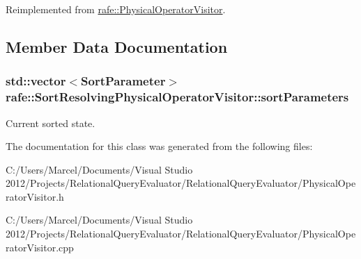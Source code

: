Reimplemented from \hyperlink{classrafe_1_1_physical_operator_visitor_a01eb10e07cc1fbe7622bc1eb01fa3b79}{rafe\+::\+Physical\+Operator\+Visitor}.



\subsection{Member Data Documentation}
\hypertarget{classrafe_1_1_sort_resolving_physical_operator_visitor_a47bd7f1cd17bf27e8313f77683413929}{
\subsubsection[{sort\+Parameters}]{\setlength{\rightskip}{0pt plus 5cm}std\+::vector$<${\bf Sort\+Parameter}$>$ rafe\+::\+Sort\+Resolving\+Physical\+Operator\+Visitor\+::sort\+Parameters}}\label{classrafe_1_1_sort_resolving_physical_operator_visitor_a47bd7f1cd17bf27e8313f77683413929}
Current sorted state. 

The documentation for this class was generated from the following files\+:\begin{DoxyCompactItemize}
\item 
C\+:/\+Users/\+Marcel/\+Documents/\+Visual Studio 2012/\+Projects/\+Relational\+Query\+Evaluator/\+Relational\+Query\+Evaluator/Physical\+Operator\+Visitor.\+h\item 
C\+:/\+Users/\+Marcel/\+Documents/\+Visual Studio 2012/\+Projects/\+Relational\+Query\+Evaluator/\+Relational\+Query\+Evaluator/Physical\+Operator\+Visitor.\+cpp\end{DoxyCompactItemize}

